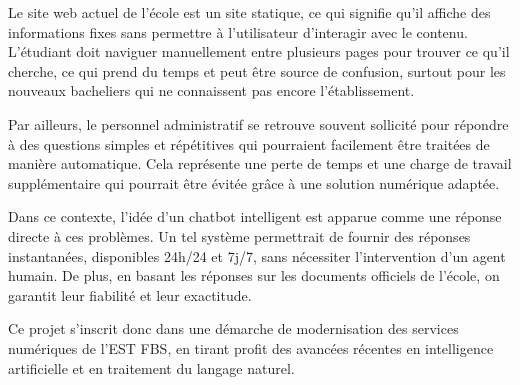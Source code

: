 \documentclass[12pt, a4paper, twoside]{report}
\begin{document}
Le site web actuel de l'école est un site statique, ce qui signifie qu'il affiche des \newline informations fixes sans permettre à l'utilisateur d'interagir avec le contenu.
L'étudiant doit naviguer manuellement entre plusieurs pages pour trouver ce qu'il cherche, ce qui prend du temps et peut être source de confusion, surtout pour les nouveaux bacheliers qui ne connaissent pas encore l'établissement.
\newline

Par ailleurs, le personnel administratif se retrouve souvent sollicité pour répondre à des questions simples et répétitives qui pourraient facilement être traitées de manière \newline automatique. Cela représente une perte de temps et une charge de travail supplémentaire qui pourrait être évitée grâce à une solution numérique adaptée.
\newline

Dans ce contexte, l'idée d'un chatbot intelligent est apparue comme une réponse \newline directe à ces problèmes. Un tel système permettrait de fournir des réponses instantanées, disponibles 24h/24 et 7j/7, sans nécessiter l'intervention d'un agent humain. De plus, en basant les réponses sur les documents officiels de l'école, on garantit leur fiabilité et leur exactitude.
\newline

Ce projet s'inscrit donc dans une démarche de modernisation des services numériques de l'EST FBS, en tirant profit des avancées récentes en intelligence artificielle et en \newline traitement du langage naturel. 

\newpage
\end{document}
